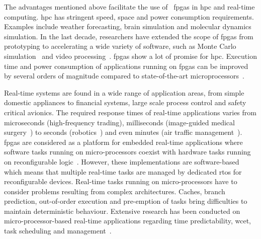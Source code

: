 The advantages mentioned above facilitate the use of ~\glspl{fpga} in \gls{hpc} and real-time computing.
\gls{hpc} has stringent speed, space and power consumption requirements.
Examples include weather forecasting, brain simulation and molecular dynamics simulation. 
In the last decade, researchers have extended the scope of \glspl{fpga} from prototyping to accelerating a wide variety of software, such as Monte Carlo simulation~\cite{chow12} and video processing~\cite{guo04}.
\glspl{fpga} show a lot of promise for \gls{hpc}.
Execution time and power consumption of applications running on \glspl{fpga} can be improved by several orders of magnitude compared to state-of-the-art microprocessors~\cite{chow11,chow12,craven07,guo04,pell11}.

Real-time systems are found in a wide range of application areas, from simple domestic appliances to financial systems, large scale process control and safety critical avionics.
The required response times of real-time applications varies from microseconds (high-frequency trading\cite{mcgowan10}), milliseconds (image-guided medical surgery~\cite{kwok10}) to seconds (robotics~\cite{dellaert99}) and even minutes (air traffic management~\cite{crisostomi07,eele11}). 
\glspl{fpga} are considered as a platform for embedded real-time applications where software tasks running on micro-processors coexist with hardware tasks running on reconfigurable logic~\cite{paul12,schoeberl08,whitham09,alteradoc}.
However, these implementations are software-based which means that multiple real-time tasks are managed by dedicated \gls{rtos} for reconfigurable devices.
Real-time tasks running on micro-processors have to consider problems resulting from complex architectures.
Caches, branch prediction, out-of-order execution and pre-emption of tasks bring difficulties to maintain deterministic behaviour.
Extensive research has been conducted on micro-processor-based real-time applications regarding time predictability, \gls{wcet}, task scheduling and management~\cite{burns01,davis11,puschner00}.

